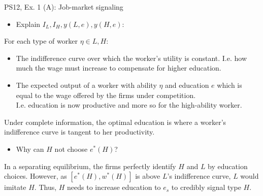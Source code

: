 \begin{frame}{PS12, Ex. 1 (A): Job-market signaling}
\begin{multicols}{2}
      \vfill\null\columnbreak
      \begin{itemize}
        \item[Step 1:] Explain $I_L,I_H,y(L,e),y(H,e)$:
      \end{itemize}\vspace{-8pt}
      For each type of worker $\eta\in L,H$:\vspace{-8pt}
      \begin{itemize}
        \item[$I_\eta$:] The indifference curve over which the worker's utility is constant.
        I.e. how much the wage must increase to compensate for higher education.
        \item[$y(\eta,e)$:] \vspace{-4pt} The expected output of a worker with ability $\eta$ and education $e$ which is equal to the wage offered by the firms under competition.\\
        I.e. education is now productive and more so for the high-ability worker.
      \end{itemize}\vspace{-8pt}
      Under complete information, the optimal education is where a worker's indifference curve is tangent to her productivity.\vspace{-8pt}
      \begin{itemize}
        \item[Step 2:] Why can $H$ not choose $e^*(H)$?
      \end{itemize}\vspace{-6pt}
      In a separating equilibrium, the firms perfectly identify $H$ and $L$ by education choices. However, as $[e^*(H),w^*(H)]$ is above $L$'s indifference curve, $L$ would imitate $H$. Thus, $H$ needs to increase education to $e_s$ to credibly signal type $H$.%
      \vfill\null
    \end{multicols}
\end{frame}
